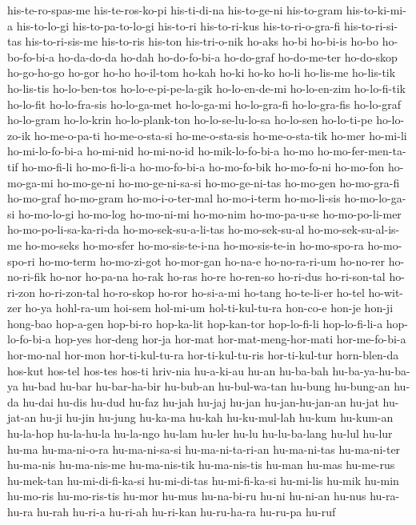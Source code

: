 {his-te-ro-spas-me his-te-ros-ko-pi his-ti-di-na his-to-ge-ni his-to-gram
his-to-ki-mi-a his-to-lo-gi his-to-pa-to-lo-gi his-to-ri his-to-ri-kus
his-to-ri-o-gra-fi his-to-ri-si-tas his-to-ri-sis-me his-to-ris his-ton
his-tri-o-nik ho-aks ho-bi ho-bi-is ho-bo ho-bo-fo-bi-a ho-da-do-da ho-dah
ho-do-fo-bi-a ho-do-graf ho-do-me-ter ho-do-skop ho-go-ho-go ho-gor ho-ho
ho-il-tom ho-kah ho-ki ho-ko ho-li ho-lis-me ho-lis-tik ho-lis-tis
ho-lo-ben-tos ho-lo-e-pi-pe-la-gik ho-lo-en-de-mi ho-lo-en-zim
ho-lo-fi-tik ho-lo-fit ho-lo-fra-sis ho-lo-ga-met ho-lo-ga-mi ho-lo-gra-fi
ho-lo-gra-fis ho-lo-graf ho-lo-gram ho-lo-krin ho-lo-plank-ton
ho-lo-se-lu-lo-sa ho-lo-sen ho-lo-ti-pe ho-lo-zo-ik ho-me-o-pa-ti
ho-me-o-sta-si ho-me-o-sta-sis ho-me-o-sta-tik ho-mer ho-mi-li
ho-mi-lo-fo-bi-a ho-mi-nid ho-mi-no-id ho-mik-lo-fo-bi-a ho-mo
ho-mo-fer-men-ta-tif ho-mo-fi-li ho-mo-fi-li-a ho-mo-fo-bi-a ho-mo-fo-bik
ho-mo-fo-ni ho-mo-fon ho-mo-ga-mi ho-mo-ge-ni ho-mo-ge-ni-sa-si
ho-mo-ge-ni-tas ho-mo-gen ho-mo-gra-fi ho-mo-graf ho-mo-gram
ho-mo-i-o-ter-mal ho-mo-i-term ho-mo-li-sis ho-mo-lo-ga-si ho-mo-lo-gi
ho-mo-log ho-mo-ni-mi ho-mo-nim ho-mo-pa-u-se ho-mo-po-li-mer
ho-mo-po-li-sa-ka-ri-da ho-mo-sek-su-a-li-tas ho-mo-sek-su-al
ho-mo-sek-su-al-is-me ho-mo-seks ho-mo-sfer ho-mo-sis-te-i-na
ho-mo-sis-te-in ho-mo-spo-ra ho-mo-spo-ri ho-mo-term ho-mo-zi-got
ho-mor-gan ho-na-e ho-no-ra-ri-um ho-no-rer ho-no-ri-fik ho-nor ho-pa-na
ho-rak ho-ras ho-re ho-ren-so ho-ri-dus ho-ri-son-tal ho-ri-zon
ho-ri-zon-tal ho-ro-skop ho-ror ho-si-a-mi ho-tang ho-te-li-er ho-tel
ho-wit-zer ho-ya hohl-ra-um hoi-sem hol-mi-um hol-ti-kul-tu-ra hon-co-e
hon-je hon-ji hong-bao hop-a-gen hop-bi-ro hop-ka-lit hop-kan-tor
hop-lo-fi-li hop-lo-fi-li-a hop-lo-fo-bi-a hop-yes hor-deng hor-ja hor-mat
hor-mat-meng-hor-mati hor-me-fo-bi-a hor-mo-nal hor-mon hor-ti-kul-tu-ra
hor-ti-kul-tu-ris hor-ti-kul-tur horn-blen-da hos-kut hos-tel hos-tes
hos-ti hriv-nia hu-a-ki-au hu-an hu-ba-bah hu-ba-ya-hu-ba-ya hu-bad hu-bar
hu-bar-ha-bir hu-bub-an hu-bul-wa-tan hu-bung hu-bung-an hu-da hu-dai
hu-dis hu-dud hu-faz hu-jah hu-jaj hu-jan hu-jan-hu-jan-an hu-jat
hu-jat-an hu-ji hu-jin hu-jung hu-ka-ma hu-kah hu-ku-mul-lah hu-kum
hu-kum-an hu-la-hop hu-la-hu-la hu-la-ngo hu-lam hu-ler hu-lu
hu-lu-ba-lang hu-lul hu-lur hu-ma hu-ma-ni-o-ra hu-ma-ni-sa-si
hu-ma-ni-ta-ri-an hu-ma-ni-tas hu-ma-ni-ter hu-ma-nis hu-ma-nis-me
hu-ma-nis-tik hu-ma-nis-tis hu-man hu-mas hu-me-rus hu-mek-tan
hu-mi-di-fi-ka-si hu-mi-di-tas hu-mi-fi-ka-si hu-mi-lis hu-mik hu-min
hu-mo-ris hu-mo-ris-tis hu-mor hu-mus hu-na-bi-ru hu-ni hu-ni-an hu-nus
hu-ra-hu-ra hu-rah hu-ri-a hu-ri-ah hu-ri-kan hu-ru-ha-ra hu-ru-pa hu-ruf
}

